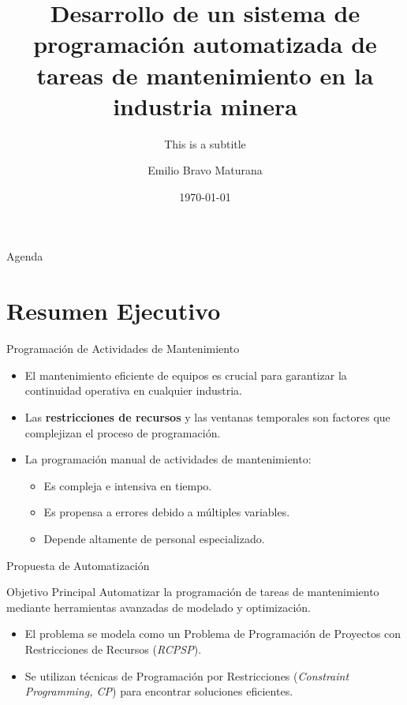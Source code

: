 \documentclass[pdfpagelabels=false, usepdftitle=false, aspectratio=169]{beamer}
\title[Short Title]{Desarrollo de un sistema de programación automatizada de tareas de mantenimiento en la industria minera}
\subtitle{This is a subtitle}
\author[Me, other]{
  Emilio Bravo Maturana
}
\institute[UM]{
  \inst{1} ROA, Maastricht University \\
  \inst{2} SBE, Maastricht University
}
\date{\today}
\begin{document}
\UMtitleframe  %



\begin{frame}{Agenda}
    \tableofcontents
\end{frame}



\section{Resumen Ejecutivo}

\begin{frame}{Programación de Actividades de Mantenimiento}
\begin{itemize}
    \item El mantenimiento eficiente de equipos es crucial para garantizar la continuidad operativa en cualquier industria.
    \vfill
    \item Las \textbf{restricciones de recursos} y las ventanas temporales son factores que complejizan el proceso de programación.
    \vfill
    \item La programación manual de actividades de mantenimiento:
    \begin{itemize}
        \item Es compleja e intensiva en tiempo.
        \item Es propensa a errores debido a múltiples variables.
        \item Depende altamente de personal especializado.
    \end{itemize}
\end{itemize}
\vfill
\end{frame}


\begin{frame}{Propuesta de Automatización}
\begin{block}{Objetivo Principal}
    Automatizar la programación de tareas de mantenimiento mediante herramientas avanzadas de modelado y optimización.
\end{block}
\vfill
\begin{itemize}
    \item El problema se modela como un Problema de Programación de Proyectos con Restricciones de Recursos (\textit{RCPSP}).
    \vfill
    \item Se utilizan técnicas de Programación por Restricciones (\textit{Constraint Programming, CP}) para encontrar soluciones eficientes.
\end{itemize}
\vfill
\end{frame}
\end{document}
